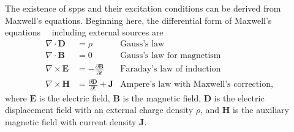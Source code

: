 The existence of \glspl{spp} and their excitation conditions
can be derived from Maxwell's equations.  Beginning here, the differential form of
Maxwell's equations~\cite{maier2007plasmonics}~\cite{benson2009elements}
including external sources are
\begin{align}
  \nabla \cdot \mathbf{D}  & = \rho                                                    & \text{Gauss's law} \label{eqn:gausslaw}                        \\
  \nabla \cdot \mathbf{B}  & = 0                                                       & \text{Gauss's law for magnetism} \label{eqn:gausslawmagnetism} \\
  \nabla \times \mathbf{E} & = -\frac{\partial \mathbf{B}} {\partial t}
                           & \text{Faraday's law of induction} \label{eqn:faradayslaw}                                                                  \\
  \nabla \times \mathbf{H} & = \frac{\partial \mathbf{D}} {\partial
  t} + \mathbf{J}          & \text{Ampere's law with Maxwell's correction},
  \label{eqn:ampereslaw}
\end{align}
where $\mathbf{E}$ is the electric field, $\mathbf{B}$ is the magnetic
field, $\mathbf{D}$ is the electric displacement field with an external
charge density $\rho$, and $\mathbf{H}$ is the auxiliary magnetic field
with current density $\mathbf{J}$.


